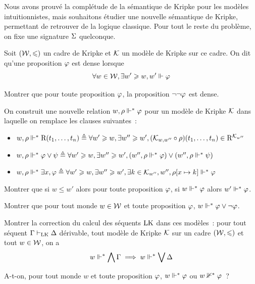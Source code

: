 \begin{problem}
  Nous avons prouvé la complétude de la sémantique de Kripke pour les modèles
  intuitionnistes, mais souhaitons étudier une nouvelle sémantique de Kripke,
  permettant de retrouver de la logique classique. Pour tout le reste du
  problème, on fixe une signature $\Sigma$ quelconque.


  Soit $(\mathcal{W},\leqslant)$ un cadre de Kripke et $\mathcal{K}$ un modèle de Kripke sur ce
  cadre. On dit qu'une proposition $\varphi$ est dense lorsque
  \[\forall w \in \mathcal{W}, \exists w' \geqslant w, w' \Vdash \varphi\]
  \begin{pbQuest}
  \item Montrer que pour toute proposition $\varphi$, la proposition
    $\lnot\lnot\varphi$ est dense.
  \end{pbQuest}
  On construit une nouvelle relation $w,\rho\Vdash^* \varphi$ pour un modèle de
  Kripke $\mathcal{K}$ dans laquelle on remplace les clauses suivantes~:
  \begin{itemize}
  \item $w,\rho\Vdash^*\mathrm{R}(t_1,\ldots,t_n) \triangleq \forall w' \geqslant w,
    \exists w'' \geqslant w', (\mathcal{K}_{w,w''}\circ \rho)(t_1,\ldots,t_n) \in
    \mathrm{R}^{\mathcal{K}_{w''}}$
  \item $w,\rho\Vdash^* \varphi \lor \psi \triangleq\forall w' \geqslant w,\exists
    w''\geqslant w', (w'',\rho\Vdash^* \varphi) \lor (w'',\rho\Vdash^*\psi)$
  \item $w,\rho\Vdash^*\exists x, \varphi \triangleq \forall w' \geqslant w,\exists
    w''\geqslant w', \exists k \in\mathcal{K}_{w''}, w'',\rho[x\mapsto k]\Vdash^*\varphi$
  \end{itemize}
  \begin{pbQuest}[resume]
  \item Montrer que si $w \leq w'$ alors pour toute proposition $\varphi$,
    si $w\Vdash^*\varphi$ alors $w'\Vdash^*\varphi$.
  \item Montrer que pour tout monde $w\in\mathcal{W}$ et toute proposition $\varphi$,
    $w\Vdash^* \varphi\lor\lnot\varphi$.
  \item Montrer la correction du calcul des séquents $\operatorname{LK}$ dans ces modèles~:
    pour tout séquent $\Gamma\vdash_{\operatorname{LK}}\Delta$ dérivable, tout modèle de Kripke
    $\mathcal{K}$ sur un cadre $(\mathcal{W},\leqslant)$ et tout $w\in\mathcal{W}$, on a
    \[w\Vdash^*\bigwedge\Gamma \implies w\Vdash^*\bigvee\Delta\]
  \item A-t-on, pour tout monde $w$ et toute proposition $\varphi$,
    $w\Vdash^*\varphi$ ou $w\nVdash^*\varphi$~?
  \end{pbQuest}


\end{problem}
